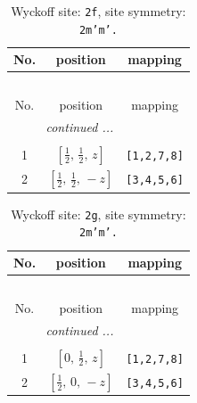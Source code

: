 \documentclass[fleqn,8pt]{jsarticle}
\begin{document}
\renewcommand{\arraystretch}{1.2}
\begin{longtable}{ccc}
\caption{Wyckoff site: {\tt 2f}, site symmetry: {\tt 2m'm'.}}
 \\
 \hline \hline
No. & position & mapping \\ \hline \endfirsthead

\multicolumn{2}{l}{\tablename\ \thetable{}} \\
 \hline \hline
No. & position & mapping \\ \hline \endhead

 \hline \hline
\multicolumn{2}{r}{\footnotesize\it continued ...} \\ \endfoot

 \hline \hline
\multicolumn{2}{r}{} \\ \endlastfoot

1 & $\left[ \frac{1}{2},\, \frac{1}{2},\, z \right]$ & {\tt [1,2,7,8]} \\ \hline
2 & $\left[ \frac{1}{2},\, \frac{1}{2},\, - z \right]$ & {\tt [3,4,5,6]} \\
\end{longtable}
\renewcommand{\arraystretch}{1.2}
\begin{longtable}{ccc}
\caption{Wyckoff site: {\tt 2g}, site symmetry: {\tt 2m'm'.}}
 \\
 \hline \hline
No. & position & mapping \\ \hline \endfirsthead

\multicolumn{2}{l}{\tablename\ \thetable{}} \\
 \hline \hline
No. & position & mapping \\ \hline \endhead

 \hline \hline
\multicolumn{2}{r}{\footnotesize\it continued ...} \\ \endfoot

 \hline \hline
\multicolumn{2}{r}{} \\ \endlastfoot

1 & $\left[ 0,\, \frac{1}{2},\, z \right]$ & {\tt [1,2,7,8]} \\ \hline
2 & $\left[ \frac{1}{2},\, 0,\, - z \right]$ & {\tt [3,4,5,6]} \\
\end{longtable}
\renewcommand{\arraystretch}{1.2}
\end{document}
